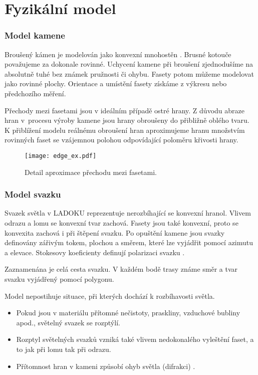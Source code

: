 \part{Fyzikální model}

\section{Model kamene}
Broušený kámen je modelován jako konvexní mnohostěn \cite{Pohl2002}. Brusné kotouče považujeme za dokonale rovinné. Uchycení kamene při broušení zjednodušíme na absolutně tuhé bez známek pružnosti či ohybu. Fasety potom můžeme modelovat jako rovinné plochy. Orientace a umístění fasety získáme z výkresu nebo předchozího měření. 

Přechody mezi fasetami jsou v ideálním případě ostré hrany. Z důvodu abraze hran v~procesu výroby kamene jsou hrany obroušeny do přibližně oblého tvaru. K přiblížení modelu reálnému obroušení hran aproximujeme hranu množstvím rovinných faset se vzájemnou polohou odpovídající poloměru křivosti hrany.  
  
\begin{figure}[htps]
\centering
\texttt{[image: edge\_ex.pdf]}
\caption{Detail aproximace přechodu mezi fasetami.}
\label{fig: edge}
\end{figure}  

\section{Model svazku}
Svazek světla v LADOKU reprezentuje nerozbíhající se konvexní hranol. Vlivem odrazu a lomu se konvexní tvar zachová. Fasety jsou také konvexní, proto se konvexita zachová i při štěpení svazku. Po opuštění kamene jsou svazky definovány zářivým tokem, plochou a směrem, které lze vyjádřit pomocí azimutu a elevace. Stokesovy koeficienty definují polarizaci svazku \cite{bodlakLADOK}. 

Zaznamenána je celá cesta svazku. V každém bodě trasy známe směr a tvar svazku vyjádřený pomocí polygonu. 

Model nepostihuje situace, při kterých dochází k rozbíhavosti světla.
\begin{itemize}
\item Pokud jsou v materiálu přítomné nečistoty, praskliny, vzduchové bubliny apod., světelný svazek se rozptýlí.
\item Rozptyl světelných svazků vzniká také vlivem nedokonalého vyleštění faset, a to jak při lomu tak při odrazu.
\item Přítomnost hran v kameni způsobí ohyb světla (difrakci) \cite{HandbookDiff}.
\end{itemize}


